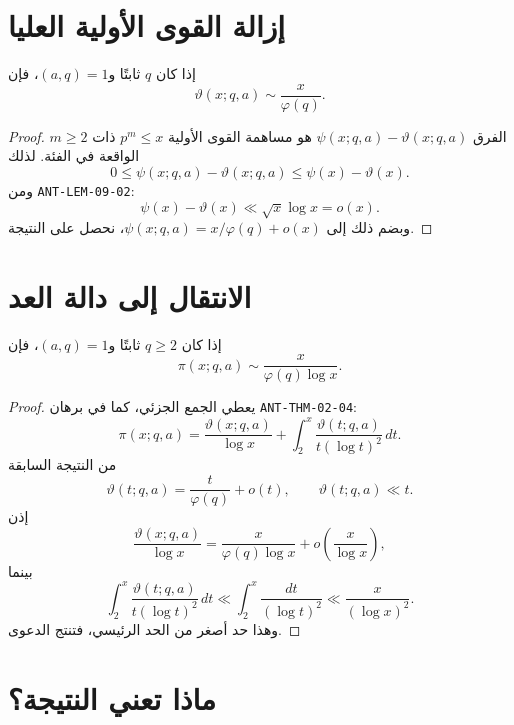 \section{إزالة القوى الأولية العليا}

\begin{corollary}
\label{cor:pnt-ap-theta}
\provedhere
إذا كان \(q\) ثابتًا و\((a,q)=1\)، فإن
\[
\vartheta(x;q,a)
\sim
\frac{x}{\varphi(q)}.
\]
\end{corollary}

\begin{proof}
الفرق \(\psi(x;q,a)-\vartheta(x;q,a)\) هو مساهمة القوى الأولية
\(p^m\le x\) ذات \(m\ge2\) الواقعة في الفئة. لذلك
\[
0\le
\psi(x;q,a)-\vartheta(x;q,a)
\le
\psi(x)-\vartheta(x).
\]
ومن \textenglish{\texttt{ANT-LEM-09-02}}:
\[
\psi(x)-\vartheta(x)
\ll\sqrt{x}\log x=o(x).
\]
وبضم ذلك إلى
\(\psi(x;q,a)=x/\varphi(q)+o(x)\)، نحصل على النتيجة.
\end{proof}

\section{الانتقال إلى دالة العد}

\begin{corollary}
\label{cor:pnt-ap-pi}
\provedhere
إذا كان \(q\ge2\) ثابتًا و\((a,q)=1\)، فإن
\[
\pi(x;q,a)
\sim
\frac{x}{\varphi(q)\log x}.
\]
\end{corollary}

\begin{proof}
يعطي الجمع الجزئي، كما في برهان
\textenglish{\texttt{ANT-THM-02-04}}:
\[
\pi(x;q,a)
=
\frac{\vartheta(x;q,a)}{\log x}
+
\int_2^x
\frac{\vartheta(t;q,a)}{t(\log t)^2}\,dt.
\]
من النتيجة السابقة
\[
\vartheta(t;q,a)
=
\frac{t}{\varphi(q)}+o(t),
\qquad
\vartheta(t;q,a)\ll t.
\]
إذن
\[
\frac{\vartheta(x;q,a)}{\log x}
=
\frac{x}{\varphi(q)\log x}
+o\!\left(\frac{x}{\log x}\right),
\]
بينما
\[
\int_2^x
\frac{\vartheta(t;q,a)}{t(\log t)^2}\,dt
\ll
\int_2^x\frac{dt}{(\log t)^2}
\ll
\frac{x}{(\log x)^2}.
\]
وهذا حد أصغر من الحد الرئيسي، فتنتج الدعوى.
\end{proof}

\section{ماذا تعني النتيجة؟}

